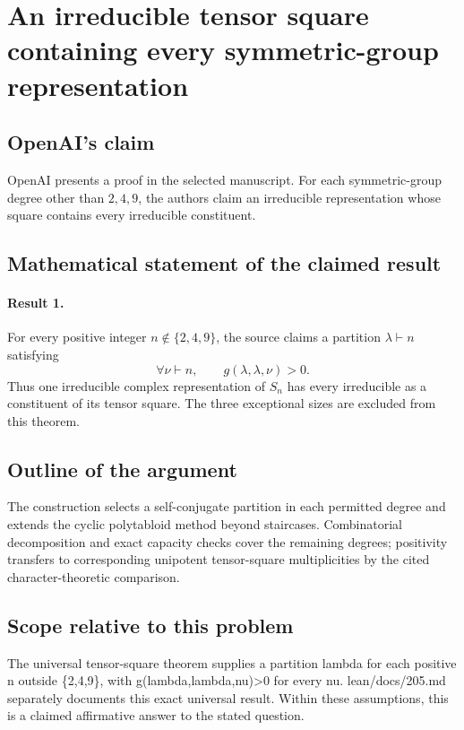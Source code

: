 \documentclass[11pt]{article}
\begin{document}
\section*{An irreducible tensor square containing every symmetric-group representation}

\subsection{OpenAI's claim}
OpenAI presents a proof in the selected manuscript. For each symmetric-group degree other than $2,4,9$, the authors claim an irreducible representation whose square contains every irreducible constituent.

\subsection{Mathematical statement of the claimed result}
\paragraph{Result 1.} For every positive integer \(n\notin\{2,4,9\}\), the source claims a partition \(\lambda\vdash n\) satisfying
\[
 \forall\nu\vdash n,\qquad g(\lambda,\lambda,\nu)>0.
\]
Thus one irreducible complex representation of \(S_n\) has every irreducible as a constituent of its tensor square. The three exceptional sizes are excluded from this theorem.

\subsection{Outline of the argument}
The construction selects a self-conjugate partition in each permitted degree and extends the cyclic polytabloid method beyond staircases. Combinatorial decomposition and exact capacity checks cover the remaining degrees; positivity transfers to corresponding unipotent tensor-square multiplicities by the cited character-theoretic comparison.

\subsection{Scope relative to this problem}
The universal tensor-square theorem supplies a partition lambda for each positive n outside \{2,4,9\}, with g(lambda,lambda,nu)>0 for every nu. lean/docs/205.md separately documents this exact universal result. Within these assumptions, this is a claimed affirmative answer to the stated question.
\end{document}
